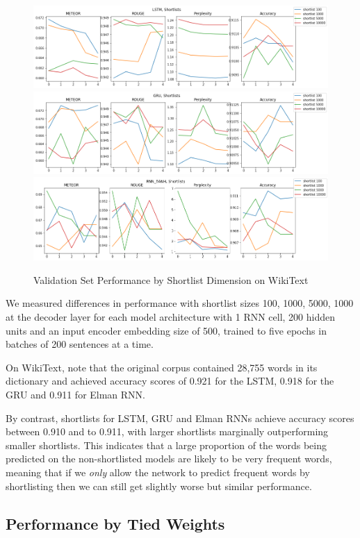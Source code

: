 \documentclass[a4paper]{article}
\begin{document}
\begin{figure}[!ht]
\includegraphics[width=0.7\columnwidth]{sr-perf-by-shortlist-lstm}
\includegraphics[width=0.7\columnwidth]{sr-perf-by-shortlist-gru}
\includegraphics[width=0.7\columnwidth]{sr-perf-by-shortlist-rnn}
\centering
\caption{Validation Set Performance by Shortlist Dimension on WikiText}
\end{figure}

We measured differences in performance with shortlist sizes 100, 1000, 5000, 1000
at the decoder layer for each model architecture with 1 RNN cell, 200 hidden units and
an input encoder embedding size of 500, trained to five epochs in batches of 200 sentences at a time.

On WikiText, note that the original corpus contained 28,755 words in its
dictionary and achieved accuracy scores of 0.921 for the LSTM, 0.918 for the GRU
and 0.911 for Elman RNN.

By contrast, shortlists for LSTM, GRU and Elman RNNs
achieve accuracy scores between 0.910 and to 0.911,
with larger shortlists marginally outperforming smaller
shortlists. This indicates that a large proportion of
the words being predicted on the non-shortlisted
models are likely to be very frequent words, meaning
that if we \emph{only} allow the network to predict
frequent words by shortlisting then we can still get
slightly worse but similar performance.

\subsection{Performance by Tied Weights}
\label{sec:perf_by_tiedweights}
\end{document}
